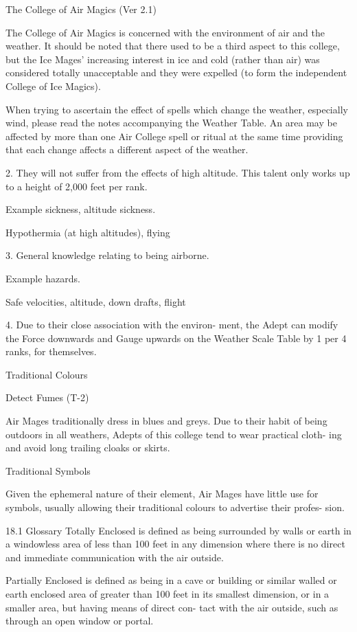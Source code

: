 \begin{Chapter}{The College of Air Magics (Ver 2.1)}

The College of Air Magics is concerned with the environment of air and
the weather.  It should be noted that there used to be a third aspect
to this college, but the Ice Mages’ increasing interest in ice and
cold (rather than air) was considered totally unacceptable and they
were expelled (to form the independent College of Ice Magics).

When trying to ascertain the effect of spells which change the
weather, especially wind, please read the notes accompanying the
Weather Table.  An area may be affected by more than one Air College
spell or ritual at the same time providing that each change affects a
different aspect of the weather.

2.  They  will  not  suffer  from  the  effects  of  high 
altitude.  This  talent  only  works  up  to  a  height  of 
2,000 feet per rank. 

Example 
sickness, altitude sickness. 

Hypothermia  (at  high  altitudes),  flying 

3. General knowledge relating to being airborne. 

Example 
hazards. 

Safe velocities, altitude, down drafts, flight 

4.  Due  to  their  close  association  with  the  environ-
ment, the  Adept  can  modify  the  Force  downwards 
and Gauge upwards on the Weather Scale Table by 
1 per 4 ranks, for themselves. 

Traditional Colours 

Detect Fumes (T-2) 

Air  Mages  traditionally  dress  in  blues  and  greys. 
Due to their habit of being outdoors in all weathers, 
Adepts of this college tend to wear practical cloth-
ing and avoid long trailing cloaks or skirts. 

Traditional Symbols 

Given  the  ephemeral  nature  of  their  element,  Air 
Mages have little use for symbols, usually allowing 
their  traditional  colours  to  advertise  their  profes-
sion. 

18.1 Glossary 
Totally Enclosed is defined as being surrounded by 
walls or earth in a windowless area of less than 100 
feet in any dimension where there is  no direct and 
immediate communication with the air outside. 

Partially Enclosed is defined as being in a cave or 
building or similar walled or earth enclosed area of 
greater  than  100  feet  in  its  smallest  dimension,  or 
in  a  smaller  area,  but  having  means  of  direct  con-
tact  with  the  air  outside,  such  as  through  an  open 
window or portal. 


\end{Chapter}
